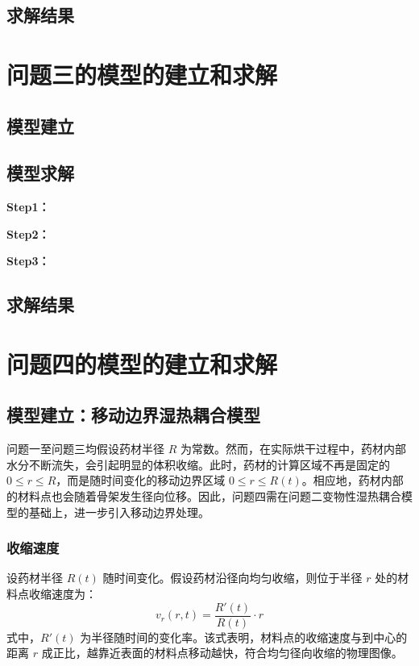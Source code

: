 \documentclass[withoutpreface,bwprint]{cumcm_thesis}
\begin{document}
\subsection{求解结果}


\section{问题三的模型的建立和求解}
\subsection{模型建立}

\subsection{模型求解}

\textbf{Step1：} 

\textbf{Step2：} 

\textbf{Step3：} 

\subsection{求解结果}


\section{问题四的模型的建立和求解}

\subsection{模型建立：移动边界湿热耦合模型}

问题一至问题三均假设药材半径 \(R\) 为常数。然而，在实际烘干过程中，药材内部水分不断流失，会引起明显的体积收缩。此时，药材的计算区域不再是固定的 \(0 \le r \le R\)，而是随时间变化的移动边界区域 \(0 \le r \le R(t)\)。相应地，药材内部的材料点也会随着骨架发生径向位移。因此，问题四需在问题二变物性湿热耦合模型的基础上，进一步引入移动边界处理。

\subsubsection{收缩速度}

设药材半径 \(R(t)\) 随时间变化。假设药材沿径向均匀收缩，则位于半径 \(r\) 处的材料点收缩速度为：
\begin{equation}
v_r(r,t) = \frac{R'(t)}{R(t)} \cdot r
\end{equation}
式中，\(R'(t)\) 为半径随时间的变化率。该式表明，材料点的收缩速度与到中心的距离 \(r\) 成正比，越靠近表面的材料点移动越快，符合均匀径向收缩的物理图像。
\end{document}
